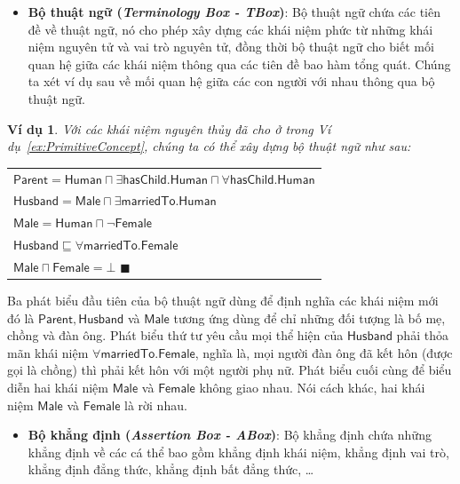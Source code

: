 \documentclass[12pt,a4paper]{report}
\newtheorem{Example}{Ví dụ}[chapter]
\newcommand{\myend}{\mbox{}\hfill\mbox{{\scriptsize$\!\blacksquare$}}}
\newcommand{\mand}{\sqcap}
\newcommand{\V}{\forall}
\newcommand{\E}{\exists}
\begin{document}
\begin{itemize}
  \item \textbf{Bộ thuật ngữ (\textit{Terminology Box - TBox})}: Bộ thuật ngữ chứa các tiên đề về thuật ngữ, nó cho phép xây dựng các khái niệm phức từ những khái niệm nguyên tử và vai trò nguyên tử, đồng thời bộ thuật ngữ cho biết mối quan hệ giữa các khái niệm thông qua các tiên đề bao hàm tổng quát. Chúng ta xét ví dụ sau về mối quan hệ giữa các con người với nhau thông qua bộ thuật ngữ.
\end{itemize}
  
\begin{Example}\label{ex:TBox}
  Với các khái niệm nguyên thủy đã cho ở trong Ví dụ~\ref{ex:PrimitiveConcept}, chúng ta có thể xây dựng bộ thuật ngữ như sau:
  
  \begin{tabular}{l}
  $\mathsf{Parent = Human \mand \E hasChild.Human \mand \V hasChild.Human}$\\
  $\mathsf{Husband = Male \mand \E marriedTo.Human}$\\
  $\mathsf{Male = Human \mand \neg Female}$\\
  $\mathsf{Husband \sqsubseteq \V marriedTo.Female}$\\
  $\mathsf{Male \mand Female = \bot}$ \hspace{59.5ex} \myend
  \end{tabular}
\end{Example}

Ba phát biểu đầu tiên của bộ thuật ngữ dùng để định nghĩa các khái niệm mới đó là $\mathsf{Parent, Husband}$ và $\mathsf{Male}$ tương ứng dùng để chỉ những đối tượng là bố mẹ, chồng và đàn ông. Phát biểu thứ tư yêu cầu mọi thể hiện của $\mathsf{Husband}$ phải thỏa mãn khái niệm $\mathsf{\V marriedTo.Female}$, nghĩa là, mọi người đàn ông đã kết hôn (được gọi là chồng) thì phải kết hôn với một người phụ nữ. Phát biểu cuối cùng để biểu diễn hai khái niệm $\mathsf{Male}$ và $\mathsf{Female}$ không giao nhau. Nói cách khác, hai khái niệm $\mathsf{Male}$ và $\mathsf{Female}$ là rời nhau.

\begin{itemize}
  \item \textbf{Bộ khẳng định (\textit{Assertion Box - ABox})}: Bộ khẳng định chứa những khẳng định về các cá thể bao gồm khẳng định khái niệm, khẳng định vai trò, khẳng định đẳng thức, khẳng định bất đẳng thức, \ldots
\end{itemize}
\end{document}
